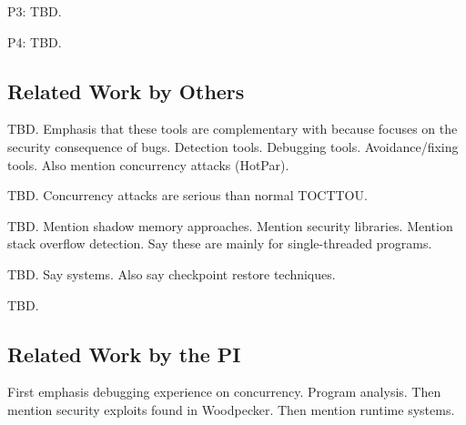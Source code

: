 

P3: TBD.

P4: TBD.


\subsection{Related Work by Others} \label{sec:others-work}

 TBD. Emphasis that these tools are 
complementary with \xxx because \xxx focuses on the security consequence of bugs.
Detection tools.
Debugging tools.
Avoidance/fixing tools.
Also mention concurrency attacks (HotPar).

 TBD. Concurrency attacks are serious than normal TOCTTOU.

 TBD.
Mention shadow memory approaches.
Mention security libraries.
Mention stack overflow detection.
Say these are mainly for single-threaded programs.

 TBD.
Say systems.
Also say checkpoint restore techniques.

 TBD.



\subsection{Related Work by the PI} \label{sec:my-work}

First emphasis debugging experience on concurrency. Program analysis.
Then mention security exploits found in Woodpecker.
Then mention runtime systems.

